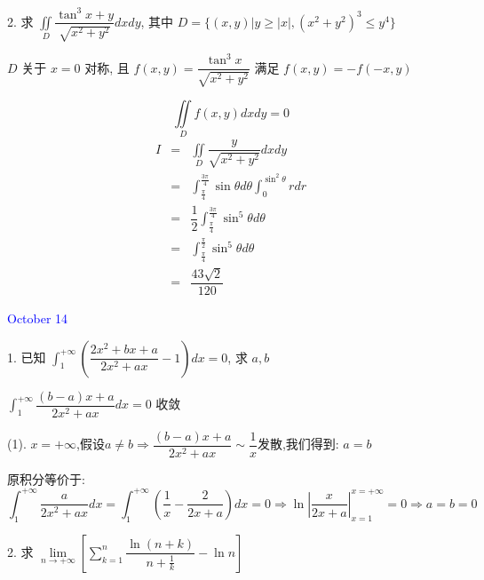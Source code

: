 2. 求 $\displaystyle{\iint\limits_{D}\dfrac{\tan^3x+y}{\sqrt{x^2+y^2}}dxdy}$, 其中 $D=\{(x,y)|y\geq |x|,(x^2+y^2)^3\leq y^4\}$


\begin{solution}
	$D$ 关于 $x = 0$ 对称, 且 $f(x,y) = \dfrac{\tan^{3}x}{\sqrt{x^{2}+y^{2}}}$ 满足 $f(x,y) = -f(-x,y)$
	
	$$\displaystyle{\iint\limits_{D}f(x,y)dxdy} = 0$$  
	\begin{eqnarray*}
		I & = & \iint\limits_{D}\dfrac{y}{\sqrt{x^2+y^2}}dxdy\\
		  & = & \int_{\frac{\pi}{4}}^{\frac{3\pi}{4}}\sin\theta d\theta\int_{0}^{\sin^{2}\theta}r dr\\
		  & = & \dfrac{1}{2}\int_{\frac{\pi}{4}}^{\frac{3\pi}{4}}\sin^5\theta d\theta\\
		  & = & \int_{\frac{\pi}{4}}^{\frac{\pi}{2}}\sin^5\theta d\theta\\
		  & = & \dfrac{43\sqrt{2}}{120}
	\end{eqnarray*}
\end{solution}


\textcolor{blue}{October 14}

1. 已知 $\displaystyle{\int_{1}^{+\infty}\left( \dfrac{2x^2+bx+a}{2x^2+ax}-1\right)dx=0}$, 求 $a,b$


\begin{solution}

	$\displaystyle{\int_{1}^{+\infty}\dfrac{(b-a)x+a}{2x^2+ax}dx=0}$ 收敛
	
	(1). $x=+\infty$,假设$a\neq b\Rightarrow \dfrac{(b-a)x+a}{2x^2+ax}\sim \dfrac{1}{x}\text{发散}$,我们得到:  $a=b$
	
	原积分等价于:  $$\int_{1}^{+\infty}\dfrac{a}{2x^2+ax}dx=\int_{1}^{+\infty}(\dfrac{1}{x}-\dfrac{2}{2x+a})dx=0\Rightarrow \ln|\dfrac{x}{2x+a}|_{x=1}^{x=+\infty}=0\Rightarrow a=b=0$$
\end{solution}


2. 求 $\lim\limits_{n\to +\infty}\left[\sum\limits_{k=1}^{n}\dfrac{\ln(n+k)}{n+\frac{1}{k}}-\ln n\right] $ 

